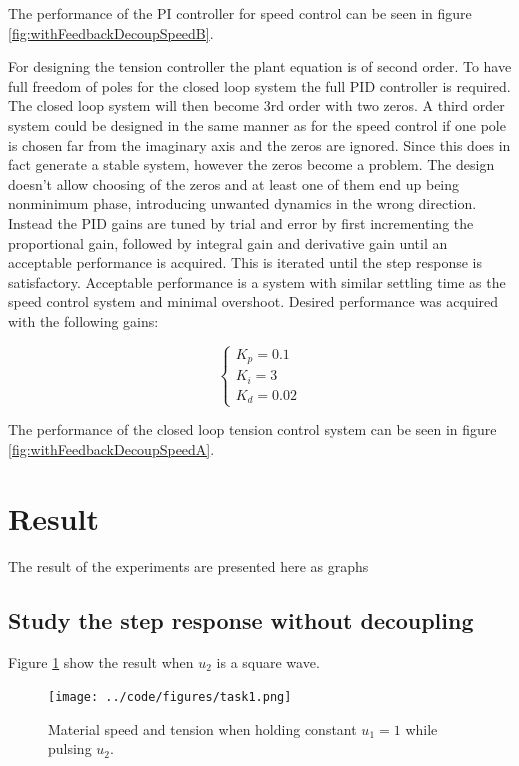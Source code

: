 \documentclass[a4paper, titlepage]{article}
\begin{document}
The performance of the PI controller for speed control can be seen in figure \ref{fig:withFeedbackDecoupSpeedB}.

For designing the tension controller the plant equation is of second order.
To have full freedom of poles for the closed loop system the full PID controller is required.
The closed loop system will then become 3rd order with two zeros.
A third order system could be designed in the same manner as for the speed control if one pole is chosen far from the imaginary axis and the zeros are ignored.
Since this does in fact generate a stable system, however the zeros become a problem.
The design doesn't allow choosing of the zeros and at least one of them end up being nonminimum phase, introducing unwanted dynamics in the wrong direction.
Instead the PID gains are tuned by trial and error by first incrementing the proportional gain, followed by integral gain and derivative gain until an acceptable performance is acquired.
This is iterated until the step response is satisfactory.
Acceptable performance is a system with similar settling time as the speed control system and minimal overshoot.
Desired performance was acquired with the following gains:

\begin{equation}
\begin{cases}
K_p = 0.1 \\ K_i = 3 \\ K_d = 0.02
\end{cases}
\end{equation}

The performance of the closed loop tension control system can be seen in figure \ref{fig:withFeedbackDecoupSpeedA}.


\section{Result}
The result of the experiments are presented here as graphs
\subsection{Study the step response without decoupling}
Figure \ref{fig:withoutDecoup} show the result when $u_2$ is a square wave. 

\begin{figure}[H]
\center
\texttt{[image: ../code/figures/task1.png]}
\caption{Material speed and tension when holding constant $u_1 = 1$ while pulsing $u_2$.}
\label{fig:withoutDecoup}
\end{figure}
\end{document}

